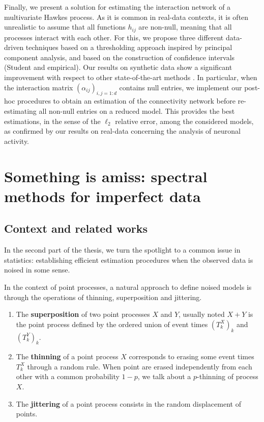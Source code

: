       Finally, we present a solution for estimating the interaction network of a multivariate Hawkes process.
      As it is common in real-data contexts, it is often unrealistic to assume that all functions $h_{ij}$ are non-null, meaning that all processes interact with each other.
      For this, we propose three different data-driven techniques based on a thresholding approach inspired by principal component analysis, and based on the construction of confidence intervals (Student and empirical).
      Our results on synthetic data show a significant improvement with respect to other state-of-the-art methods \parencite{Lemonnier2014, Bacry2020}.
      In particular, when the interaction matrix $(\alpha_{ij})_{i,j=1:d}$ contains null entries, we implement our post-hoc procedures to obtain an estimation of the connectivity network before re-estimating all non-null entries on a reduced model.
      This provides the best estimations, in the sense of the $\ell_2$ relative error, among the considered models, as confirmed by our results on real-data concerning the analysis of neuronal activity.



\section{Something is amiss: spectral methods for imperfect data}\label{sec:chap0_missing_data}
    
  \subsection{Context and related works}
  In the second part of the thesis, we turn the spotlight to a common issue in statistics: 
  establishing efficient estimation procedures when the observed data is noised in some sense.

  In the context of point processes, a natural approach to define noised models is through the operations of thinning, superposition and jittering.
  \begin{enumerate}
    \item The \textbf{superposition} of two point processes $X$ and $Y$, usually noted $X+Y$ is the point process defined by the ordered union of event times $(T_k^X)_k$ and $(T_k^Y)_k$.
    \item The \textbf{thinning} of a point process $X$ corresponds to erasing some event times $T_k^X$ through a random rule.
    When point are erased independently from each other with a common probability $1-p$, we talk about a $p$-thinning of process $X$.
    \item The \textbf{jittering} of a point process consists in the random displacement of points.
  \end{enumerate}


